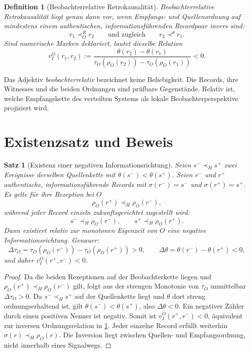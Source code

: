 \documentclass[11pt,a4paper]{article}
\newtheorem{definition}{Definition}[section]
\newtheorem{satz}{Satz}[section]
\theoremstyle{remark}
\newcommand{\host}{\prec_{\!H}}
\newcommand{\recv}{\prec_{\!O}^{R}}
\newcommand{\sourceord}{\prec^{\theta}}
\begin{document}
\begin{definition}[Beobachterrelative Retrokausalität]
\label{def:retro}
Beobachterrelative Retrokausalität liegt genau dann vor, wenn Empfangs- und
Quellenordnung auf mindestens einem authentischen, informationsführenden
Recordpaar invers sind:
\[
  r_1\recv r_2
  \qquad\text{und zugleich}\qquad
  r_2\sourceord r_1.
\]
Sind numerische Marken deklariert, lautet dieselbe Relation
\[
  v_I^O(r_1,r_2)
  :=\frac{\theta(r_2)-\theta(r_1)}
          {\tau_O(\rho_O(r_2))-\tau_O(\rho_O(r_1))}<0.
\]
\end{definition}

Das Adjektiv \emph{beobachterrelativ} bezeichnet keine Beliebigkeit. Die
Records, ihre Witnesses und die beiden Ordnungen sind prüfbare Gegenstände.
Relativ ist, welche Empfangskette des verteilten Systems als lokale
Beobachterperspektive projiziert wird.

\section{Existenzsatz und Beweis}

\begin{satz}[Existenz einer negativen Informationsrichtung]
\label{thm:existence}
Seien \(s^-\host s^+\) zwei Ereignisse derselben Quellenkette mit
\(\theta(s^-)<\theta(s^+)\). Seien \(r^-\) und \(r^+\) authentische,
informationsführende Records mit \(\sigma(r^-)=s^-\) und
\(\sigma(r^+)=s^+\). Es gelte für ihre Rezeption bei \(O\)
\[
  \rho_O(r^+)\host\rho_O(r^-),
\]
während jeder Record einzeln zukunftsgerichtet zugestellt wird:
\[
  s^-\host\rho_O(r^-),\qquad
  s^+\host\rho_O(r^+).
\]
Dann existiert relativ zur monotonen Eigenzeit von \(O\) eine negative
Informationsrichtung. Genauer:
\[
  \Delta\tau_O
  =\tau_O(\rho_O(r^-))-\tau_O(\rho_O(r^+))>0,
  \qquad
  \Delta\theta
  =\theta(r^-)-\theta(r^+)<0,
\]
und daher \(v_I^O(r^+,r^-)<0\).
\end{satz}

\begin{proof}
Da die beiden Rezeptionen auf der Beobachterkette liegen und
\(\rho_O(r^+)\host\rho_O(r^-)\) gilt, folgt aus der strengen Monotonie von
\(\tau_O\) unmittelbar \(\Delta\tau_O>0\). Da \(s^-\host s^+\) auf der
Quellenkette liegt und \(\theta\) dort streng ordnungserhaltend ist, gilt
\(\theta(s^-)<\theta(s^+)\), also \(\Delta\theta<0\). Ein negativer Zähler
durch einen positiven Nenner ist negativ. Somit ist
\(v_I^O(r^+,r^-)<0\), äquivalent zur inversen Ordnungsrelation in
\cref{def:retro}. Jeder einzelne Record erfüllt weiterhin
\(\sigma(r)\host\rho_O(r)\). Die Inversion liegt zwischen Quellen- und
Empfangsordnung, nicht innerhalb eines Signalwegs.
\end{proof}
\end{document}
